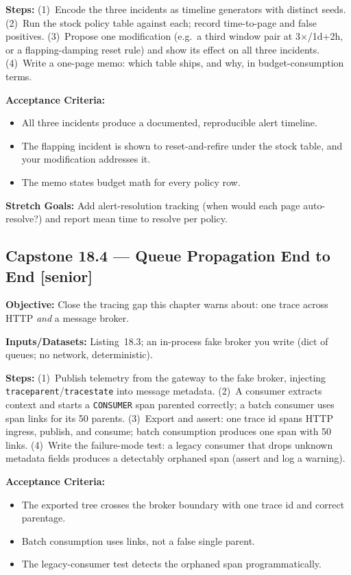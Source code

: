 \textbf{Steps:} (1)~Encode the three incidents as timeline generators with
distinct seeds. (2)~Run the stock policy table against each; record
time-to-page and false positives. (3)~Propose one modification (e.g.\ a
third window pair at 3$\times$/1d+2h, or a flapping-damping reset rule) and
show its effect on all three incidents. (4)~Write a one-page memo: which
table ships, and why, in budget-consumption terms.

\textbf{Acceptance Criteria:}
\begin{itemize}
  \item[$\square$] All three incidents produce a documented, reproducible
        alert timeline.
  \item[$\square$] The flapping incident is shown to reset-and-refire under
        the stock table, and your modification addresses it.
  \item[$\square$] The memo states budget math for every policy row.
\end{itemize}

\textbf{Stretch Goals:} Add alert-resolution tracking (when would each page
auto-resolve?) and report mean time to resolve per policy.

\subsection*{Capstone 18.4 --- Queue Propagation End to End \hfill [senior]}
\textbf{Objective:} Close the tracing gap this chapter warns about: one
trace across HTTP \emph{and} a message broker.

\textbf{Inputs/Datasets:} Listing~18.3; an in-process fake broker you write
(dict of queues; no network, deterministic).

\textbf{Steps:} (1)~Publish telemetry from the gateway to the fake broker,
injecting \texttt{traceparent}/\texttt{tracestate} into message metadata.
(2)~A consumer extracts context and starts a \texttt{CONSUMER} span parented
correctly; a batch consumer uses span links for its 50 parents. (3)~Export
and assert: one trace id spans HTTP ingress, publish, and consume; batch
consumption produces one span with 50 links. (4)~Write the failure-mode
test: a legacy consumer that drops unknown metadata fields produces a
detectably orphaned span (assert and log a warning).

\textbf{Acceptance Criteria:}
\begin{itemize}
  \item[$\square$] The exported tree crosses the broker boundary with one
        trace id and correct parentage.
  \item[$\square$] Batch consumption uses links, not a false single parent.
  \item[$\square$] The legacy-consumer test detects the orphaned span
        programmatically.
\end{itemize}

